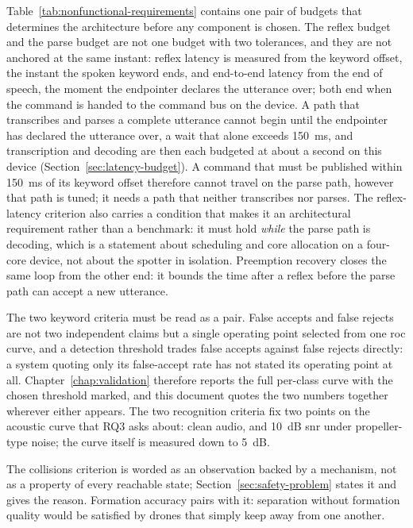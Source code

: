 Table~\ref{tab:nonfunctional-requirements} contains one pair of budgets that determines the
architecture before any component is chosen. The reflex budget and the parse budget are not one
budget with two tolerances, and they are not anchored at the same instant: reflex latency is
measured from the keyword offset, the instant the spoken keyword ends, and end-to-end latency from
the end of speech, the moment the endpointer declares the utterance over; both end when the command is
handed to the command bus on the device. A path that transcribes and parses a complete utterance
cannot begin until the endpointer has declared the utterance over, a wait that alone exceeds
150~ms, and transcription and decoding are then each budgeted at about a second on this device
(Section~\ref{sec:latency-budget}). A command that must be published within 150~ms of its keyword
offset therefore cannot travel on the parse path, however that path is tuned; it needs a path that
neither transcribes nor parses. The reflex-latency criterion also carries a condition that makes it
an architectural requirement rather than a benchmark: it must hold \emph{while} the parse path is
decoding, which is a statement about scheduling and core allocation on a four-core device, not
about the spotter in isolation. Preemption recovery closes the same loop from the other end: it
bounds the time after a reflex before the parse path can accept a new utterance.

The two keyword criteria must be read as a pair. False accepts and false rejects are not two
independent claims but a single operating point selected from one \gls{roc} curve, and a detection
threshold trades false accepts against false rejects directly: a system quoting only its
false-accept rate has not stated its operating point at all. Chapter~\ref{chap:validation}
therefore reports the full per-class curve with the chosen threshold marked, and this document
quotes the two numbers together wherever either appears. The two recognition criteria fix two
points on the acoustic curve that RQ3 asks about: clean audio, and 10~dB \gls{snr} under
propeller-type noise; the curve itself is measured down to 5~dB.

The collisions criterion is worded as an observation backed by a mechanism, not as a property of
every reachable state; Section~\ref{sec:safety-problem} states it and gives the reason. Formation
accuracy pairs with it: separation without formation quality would be satisfied by drones that
simply keep away from one another.

